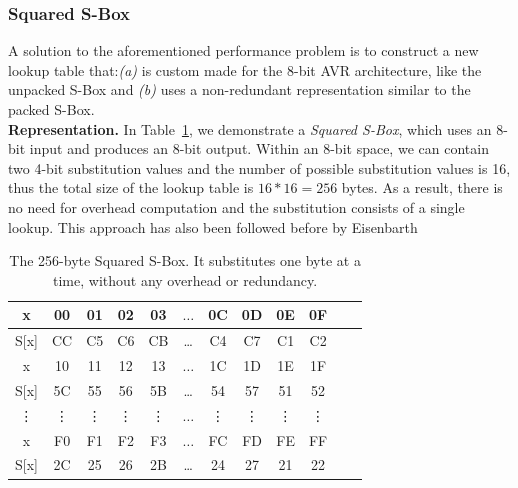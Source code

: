 \documentclass[11pt]{llncs2e} %
\begin{document}
\subsubsection{Squared S-Box}\label{ssbox}
A solution to the aforementioned performance problem is to construct a new lookup table that:\emph{(a)} is custom made for the 8-bit AVR architecture, like the unpacked S-Box and \emph{(b)} uses a non-redundant representation similar to the packed S-Box.\\
\textbf{Representation.} In Table~\ref{squared_sbox}, we demonstrate a \emph{Squared S-Box}, which uses an 8-bit input and produces an 8-bit output. Within an 8-bit space, we can contain two 4-bit substitution values and the number of possible substitution values is 16, thus the total size of the lookup table is $16*16=256$ bytes. As a result, there is no need for overhead computation and the substitution consists of a single lookup. This approach has also been followed before by Eisenbarth~\cite{eisenbarth2012compact}\\
\begin{table}[h]
\footnotesize
\centering
\begin{tabular}{| c | c  | c | c | c  | c  | c | c | c  | c | c | c |}
\hline
  x & 00 & 01 & 02 & 03  &  $\dots$  & 0C & 0D & 0E & 0F   \\
\hline
 S[x] & CC & C5 & C6 & CB & \dots & C4 & C7 & C1 & C2   \\
\hline
  x & 10 & 11 & 12 & 13  &  $\dots$  & 1C & 1D & 1E & 1F   \\
\hline
 S[x] & 5C & 55 & 56 & 5B & \dots & 54 & 57 & 51 & 52   \\
\hline
  \vdots & \vdots & \vdots & \vdots & \vdots  &  $\dots$  & \vdots &\vdots & \vdots & \vdots   \\
\hline
  x & F0 & F1 & F2 & F3  &  $\dots$  & FC & FD & FE & FF   \\
\hline
 S[x] & 2C & 25 & 26 & 2B & \dots & 24 & 27 & 21 & 22   \\


\hline
\end{tabular}
 \caption{\footnotesize The 256-byte Squared S-Box. It substitutes one byte at a time, without any overhead or redundancy.}
 \label{squared_sbox}
\end{table}
\end{document}
